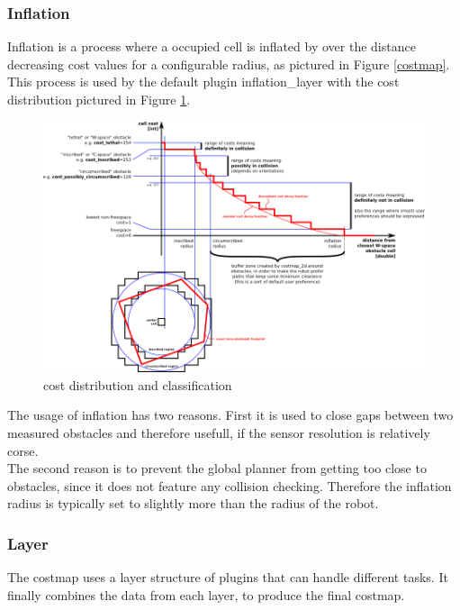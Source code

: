 \subsubsection{Inflation}
Inflation is a process where a occupied cell is inflated by over the distance decreasing cost values for a configurable radius, as pictured in Figure \ref{costmap}.\\
This process is used by the default plugin inflation\_layer with the cost distribution pictured in Figure \ref{costdistribution}\cite{costmap}.
\begin{figure}[H]
	\centering
	\includegraphics[width=\linewidth]{Pictures/costmapinflation}
	\caption{cost distribution and classification \cite{costmap}}
	\label{costdistribution}
\end{figure}

The usage of inflation has two reasons. First it is used to close gaps between two measured obstacles and therefore usefull, if the sensor resolution is relatively corse.\\
The second reason is to prevent the global planner from getting too close to obstacles, since it does not feature any collision checking. Therefore the inflation radius is typically set to slightly more than the radius of the robot\cite{costmap}.

\subsubsection{Layer}
The costmap uses a layer structure of plugins that can handle different tasks. It finally combines the data from each layer, to produce the final costmap.\\

